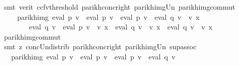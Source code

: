 \begin{isabellebody}
\ {\isacharparenleft}{\kern0pt}smt\ {\isacharparenleft}{\kern0pt}verit{\isacharcomma}{\kern0pt}\ ccfv{\isacharunderscore}{\kern0pt}threshold{\isacharparenright}{\kern0pt}\ parikh{\isacharunderscore}{\kern0pt}conc{\isacharunderscore}{\kern0pt}right\ parikh{\isacharunderscore}{\kern0pt}img{\isacharunderscore}{\kern0pt}Un\ parikh{\isacharunderscore}{\kern0pt}img{\isacharunderscore}{\kern0pt}commut{\isacharparenright}{\kern0pt}\isanewline
\ \ \ \ \isamarkupfalse%
\ \isamarkupfalse%
\ {\isachardoublequoteopen}{\isasymdots}\ {\isacharequal}{\kern0pt}\ parikh{\isacharunderscore}{\kern0pt}img\ {\isacharparenleft}{\kern0pt}eval\ p{}\ v\ {\isacharat}{\kern0pt}{\isacharat}{\kern0pt}\ eval\ p{}\ v\ {\isasymunion}\ {\isacharparenleft}{\kern0pt}eval\ p{}\ v\ {\isacharat}{\kern0pt}{\isacharat}{\kern0pt}\ eval\ q{}\ v\ {\isacharat}{\kern0pt}{\isacharat}{\kern0pt}\ v\ x\ {\isasymunion}\isanewline
\ \ \ \ \ \ \ \ eval\ q{}\ v\ {\isacharat}{\kern0pt}{\isacharat}{\kern0pt}\ eval\ p{}\ v\ {\isacharat}{\kern0pt}{\isacharat}{\kern0pt}\ v\ x\ {\isasymunion}\ eval\ q{}\ v\ {\isacharat}{\kern0pt}{\isacharat}{\kern0pt}\ v\ x\ {\isacharat}{\kern0pt}{\isacharat}{\kern0pt}\ eval\ q{}\ v\ {\isacharat}{\kern0pt}{\isacharat}{\kern0pt}\ v\ x{\isacharparenright}{\kern0pt}{\isacharparenright}{\kern0pt}{\isachardoublequoteclose}\isanewline
\ \ \ \ \ \ \isamarkupfalse%
\ parikh{\isacharunderscore}{\kern0pt}img{\isacharunderscore}{\kern0pt}commut\ \isamarkupfalse%
\ {\isacharparenleft}{\kern0pt}smt\ {\isacharparenleft}{\kern0pt}z{}{\isacharparenright}{\kern0pt}\ conc{\isacharunderscore}{\kern0pt}Un{\isacharunderscore}{\kern0pt}distrib{\isacharparenleft}{\kern0pt}{}{\isacharparenright}{\kern0pt}\ parikh{\isacharunderscore}{\kern0pt}conc{\isacharunderscore}{\kern0pt}right\ parikh{\isacharunderscore}{\kern0pt}img{\isacharunderscore}{\kern0pt}Un\ sup{\isacharunderscore}{\kern0pt}assoc{\isacharparenright}{\kern0pt}\isanewline
\ \ \ \ \isamarkupfalse%
\ \isamarkupfalse%
\ {\isachardoublequoteopen}{\isasymdots}\ {\isacharequal}{\kern0pt}\ parikh{\isacharunderscore}{\kern0pt}img\ {\isacharparenleft}{\kern0pt}eval\ p{}\ v\ {\isacharat}{\kern0pt}{\isacharat}{\kern0pt}\ eval\ p{}\ v\ {\isasymunion}\ {\isacharparenleft}{\kern0pt}eval\ p{}\ v\ {\isacharat}{\kern0pt}{\isacharat}{\kern0pt}\ eval\ q{}\ v\ {\isasymunion}\isanewline

\end{isabellebody}

